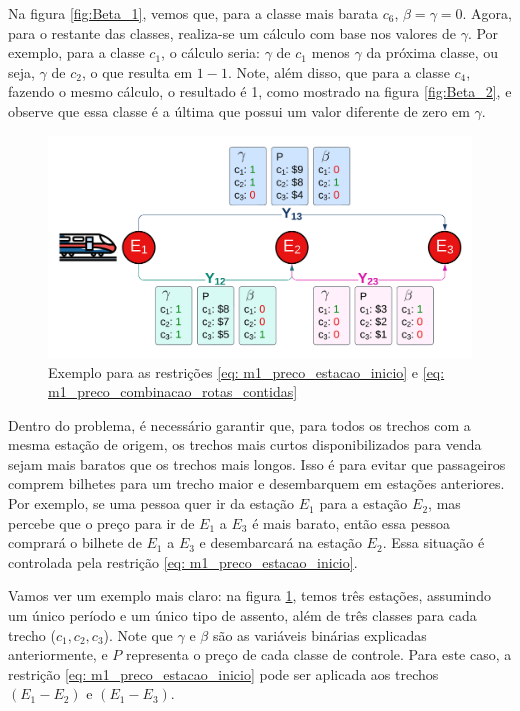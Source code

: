 Na figura \ref{fig:Beta_1}, vemos que, para a classe mais barata $c_6$, $\beta=\gamma=0$. Agora, para o restante das classes, realiza-se um cálculo com base nos valores de $\gamma$. Por exemplo, para a classe $c_1$, o cálculo seria: $\gamma$ de $c_1$ menos $\gamma$ da próxima classe, ou seja, $\gamma$ de $c_2$, o que resulta em $1-1$. Note, além disso, que para a classe $c_4$, fazendo o mesmo cálculo, o resultado é 1, como mostrado na figura \ref{fig:Beta_2}, e observe que essa classe é a última que possui um valor diferente de zero em $\gamma$.


\begin{figure}[H]
	\begin{center}
		\includegraphics[scale=0.2]{img/fulfill.png}
		\caption{Exemplo para as restrições \ref{eq: m1_preco_estacao_inicio} e \ref{eq: m1_preco_combinacao_rotas_contidas}}
		\label{fig: fulfill}
	\end{center}
\end{figure}

Dentro do problema, é necessário garantir que, para todos os trechos com a mesma estação de origem, os trechos mais curtos disponibilizados para venda sejam mais baratos que os trechos mais longos. Isso é para evitar que passageiros comprem bilhetes para um trecho maior e desembarquem em estações anteriores. Por exemplo, se uma pessoa quer ir da estação $E_1$ para a estação $E_2$, mas percebe que o preço para ir de $E_1$ a $E_3$ é mais barato, então essa pessoa comprará o bilhete de $E_1$ a $E_3$ e desembarcará na estação $E_2$. Essa situação é controlada pela restrição \ref{eq: m1_preco_estacao_inicio}. 

Vamos ver um exemplo mais claro: na figura \ref{fig: fulfill}, temos três estações, assumindo um único período e um único tipo de assento, além de três classes para cada trecho ($c_1, c_2, c_3$). Note que $\gamma$ e $\beta$ são as variáveis binárias explicadas anteriormente, e $P$ representa o preço de cada classe de controle. Para este caso, a restrição \ref{eq: m1_preco_estacao_inicio} pode ser aplicada aos trechos $(E_1-E_2)$ e $(E_1-E_3)$.

